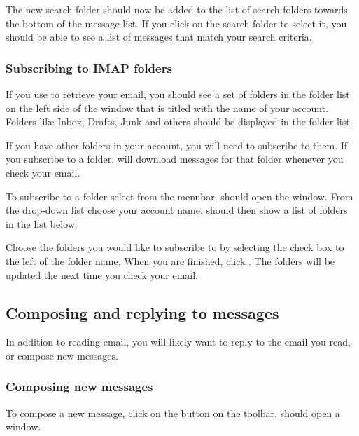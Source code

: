 The new search folder should now be added to the list of search folders towards
the bottom of the message list. If you click on the search folder to select it,
you should be able to see a list of messages that match your search criteria.

\subsubsection{Subscribing to IMAP folders}

If you use  to retrieve your email, you should see a set of folders in the
folder list on the left side of the window that is titled with the name of
your  account. Folders like Inbox, Drafts, Junk and others should be
displayed in the folder list.

If you have other folders in your  account, you will need to subscribe
to them. If you subscribe to a folder,  will download messages
for that folder whenever you check your email.

To subscribe to a folder select  from the
menubar.  should open the  window.
From the  drop-down list choose your account name. 
should then show a list of folders in the list below.


Choose the folders you would like to subscribe to by selecting the check box
to the left of the folder name. When you are finished, click . 
The folders will be updated the next time you check your email.

\subsection{Composing and replying to messages}

In addition to reading email, you will likely want to reply to the email
you read, or compose new messages.

\subsubsection{Composing new messages}

To compose a new message, click on the  button on the toolbar.
 should open a  window.

